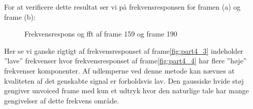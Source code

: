 For at verificere dette resultat ser vi på frekvensresponsen for framen (a) og frame (b):
 \begin{figure}[!h]
	\centering
	\caption{ Frekvensrespons og fft af frame 159 og frame 190 }
	\label{fig:part4_vocaltrack}
\end{figure}

Her se vi ganske rigtigt af frekvensresponset af frame\ref{fig:part4_3} indeholder ''lave'' frekvenser hvor frekvensresponset af frame\ref{fig:part4_4} har flere ''høje'' frekvenser komponenter.
Af udlemperne ved denne metode kan nævnes at kvaliteten af det genskabte signal er forholdsvis lav. Den gaussiske hvide støj gengiver  unvoiced frame med kun et udtryk hvor den naturlige tale har mange gengivelser af dette frekvens område.   